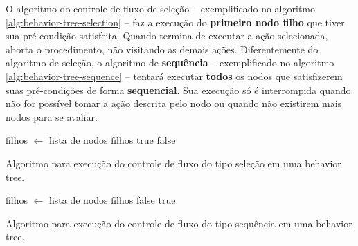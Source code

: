 O algoritmo do controle de fluxo de seleção -- exemplificado no algoritmo
\ref{alg:behavior-tree-selection} -- faz a execução do \textbf{primeiro nodo
filho} que tiver sua pré-condição satisfeita. Quando termina de executar a ação
selecionada, aborta o procedimento, não visitando as demais ações.
Diferentemente do algoritmo de seleção, o algoritmo de \textbf{sequência} --
exemplificado no algoritmo \ref{alg:behavior-tree-sequence} -- tentará executar
\textbf{todos} os nodos que satisfizerem suas pré-condições de forma
\textbf{sequencial}. Sua execução só é interrompida quando não for possível
tomar a ação descrita pelo nodo ou quando não existirem mais nodos para se
avaliar.

\begin{algorithm}[H]
\begin{center}
	\begin{algorithmic}[1]
        \STATE filhos $\gets$ lista de nodos filhos
                \RETURN true
            \ENDIF
        \ENDFOR
        \RETURN false
    \end{algorithmic}
\end{center}
\caption[Algoritmo para execução do controle de fluxo do tipo seleção em uma
behavior tree.]
{\label{alg:behavior-tree-selection} Algoritmo para execução do controle de
fluxo do tipo seleção em uma behavior tree.}
\end{algorithm}

\begin{algorithm}[H]
\begin{center}
	\begin{algorithmic}[1]
        \STATE filhos $\gets$ lista de nodos filhos
                \RETURN false
            \ENDIF
        \ENDFOR
        \RETURN true
    \end{algorithmic}
\end{center}
\caption[Algoritmo para execução do controle de fluxo do tipo sequência em uma
behavior tree.]
{\label{alg:behavior-tree-sequence} Algoritmo para execução do controle de fluxo
do tipo sequência em uma behavior tree.}
\end{algorithm}

